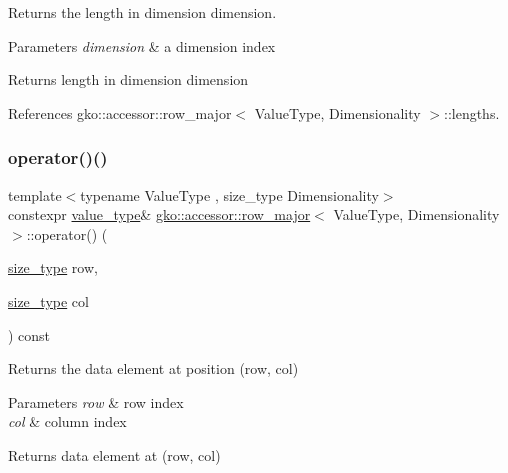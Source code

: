 Returns the length in dimension {\ttfamily dimension}. 


\begin{DoxyParams}{Parameters}
{\em dimension} & a dimension index\\
\hline
\end{DoxyParams}
\begin{DoxyReturn}{Returns}
length in dimension {\ttfamily dimension} 
\end{DoxyReturn}


References gko\+::accessor\+::row\+\_\+major$<$ Value\+Type, Dimensionality $>$\+::lengths.

\mbox{\label{classgko_1_1accessor_1_1row__major_a669d87e6198b1bdb4c915b909a61f756}} 
\subsubsection{\texorpdfstring{operator()()}{operator()()}\hspace{0.1cm}{\footnotesize\ttfamily [1/2]}}
{\footnotesize\ttfamily template$<$typename Value\+Type , size\+\_\+type Dimensionality$>$ \\
constexpr \hyperlink{classgko_1_1accessor_1_1row__major_a687bda931be92c31abf02965fa72ceba}{value\+\_\+type}\& \hyperlink{classgko_1_1accessor_1_1row__major}{gko\+::accessor\+::row\+\_\+major}$<$ Value\+Type, Dimensionality $>$\+::operator() (\begin{DoxyParamCaption}\item[{\hyperlink{namespacegko_a6e5c95df0ae4e47aab2f604a22d98ee7}{size\+\_\+type}}]{row,  }\item[{\hyperlink{namespacegko_a6e5c95df0ae4e47aab2f604a22d98ee7}{size\+\_\+type}}]{col }\end{DoxyParamCaption}) const\hspace{0.3cm}{\ttfamily [inline]}}



Returns the data element at position (row, col) 


\begin{DoxyParams}{Parameters}
{\em row} & row index \\
\hline
{\em col} & column index\\
\hline
\end{DoxyParams}
\begin{DoxyReturn}{Returns}
data element at (row, col) 
\end{DoxyReturn}


